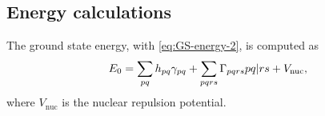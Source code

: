 \subsection{Energy calculations}
The ground state energy, with \cref{eq:GS-energy-2}, is computed as
\begin{equation}
    E_0 = 
    \sum_{pq} h_{pq} \fordm_{pq}
    +
    \sum_{pqrs}
    \sordm_{pqrs} \PBraket{pq | rs}
    + V_{\text{nuc}}
    ,
\end{equation}
where $V_{\text{nuc}}$ is the nuclear repulsion potential.
